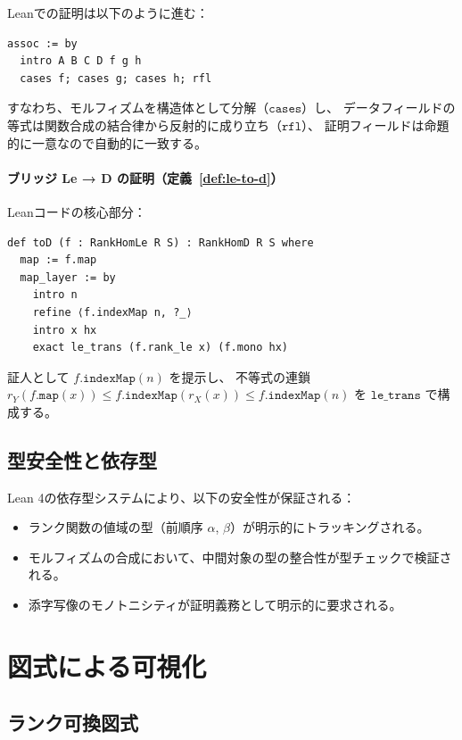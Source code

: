 \documentclass[11pt,a4paper,ja=standard]{bxjsarticle}
\theoremstyle{definition}
\begin{document}
Leanでの証明は以下のように進む：
\begin{verbatim}
assoc := by
  intro A B C D f g h
  cases f; cases g; cases h; rfl
\end{verbatim}

すなわち、モルフィズムを構造体として分解（$\mathtt{cases}$）し、
データフィールドの等式は関数合成の結合律から反射的に成り立ち（$\mathtt{rfl}$）、
証明フィールドは命題的に一意なので自動的に一致する。

\paragraph{ブリッジ Le → D の証明（定義~\ref{def:le-to-d}）}

Leanコードの核心部分：
\begin{verbatim}
def toD (f : RankHomLe R S) : RankHomD R S where
  map := f.map
  map_layer := by
    intro n
    refine ⟨f.indexMap n, ?_⟩
    intro x hx
    exact le_trans (f.rank_le x) (f.mono hx)
\end{verbatim}

証人として $f.\mathtt{indexMap}(n)$ を提示し、
不等式の連鎖 $r_Y(f.\mathtt{map}(x)) \le f.\mathtt{indexMap}(r_X(x)) \le f.\mathtt{indexMap}(n)$
を $\mathtt{le\_trans}$ で構成する。

\subsection{型安全性と依存型}

Lean 4の依存型システムにより、以下の安全性が保証される：

\begin{itemize}
\item ランク関数の値域の型（前順序 $\alpha$, $\beta$）が明示的にトラッキングされる。
\item モルフィズムの合成において、中間対象の型の整合性が型チェックで検証される。
\item 添字写像のモノトニシティが証明義務として明示的に要求される。
\end{itemize}

\section{図式による可視化}

\subsection{ランク可換図式}
\end{document}
